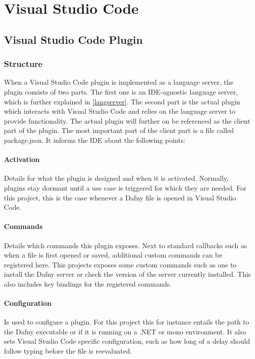 \section{Visual Studio Code}

\subsection{Visual Studio Code Plugin}
\subsubsection{Structure}
When a Visual Studio Code plugin is implemented as a language server, the plugin consists of two parts. The first one is an IDE-agnostic language server, which is further explained in \ref{langserver}. The second part is the actual plugin which interacts with Visual Studio Code and relies on the language server to provide functionality. \newline
The actual plugin will further on be referenced as the client part of the plugin. The most important part of the client part is a file called package.json. It informs the IDE about the following points:
\paragraph{Activation}
Details for what the plugin is designed and when it is activated. Normally, plugins stay dormant until a use case is triggered for which they are needed. For this project, this is the case whenever a Dafny file is opened in Visual Studio Code.

\paragraph{Commands}
Details which commands this plugin exposes. Next to standard callbacks such as when a file is first opened or saved, additional custom commands can be registered here. This projects exposes some custom commands such as one to install the Dafny server or check the version of the server currently installed. This also includes key bindings for the registered commands.

\paragraph{Configuration}
Is used to configure a plugin. For this project this for instance entails the path to the Dafny executable or if it is running on a .NET or mono environment. It also sets Visual Studio Code specific configuration, such as how long of a delay should follow typing before the file is reevaluated.

